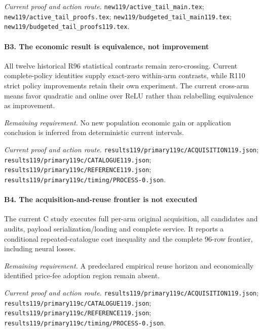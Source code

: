 \par\emph{Current proof and action route.} \nolinkurl{new119/active_tail_main.tex}; \nolinkurl{new119/active_tail_proofs.tex}; \nolinkurl{new119/budgeted_tail_main119.tex}; \nolinkurl{new119/budgeted_tail_proofs119.tex}.

\paragraph{B3. The economic result is equivalence, not improvement}

All twelve historical R96 statistical contrasts remain zero-crossing. Current complete-policy identities supply exact-zero within-arm contrasts, while R110 strict policy improvements retain their own experiment. The current cross-arm means favor quadratic and online over ReLU rather than relabelling equivalence as improvement.

\par\emph{Remaining requirement.} No new population economic gain or application conclusion is inferred from deterministic current intervals.

\par\emph{Current proof and action route.} \nolinkurl{results119/primary119c/ACQUISITION119.json}; \nolinkurl{results119/primary119c/CATALOGUE119.json}; \nolinkurl{results119/primary119c/REFERENCE119.json}; \nolinkurl{results119/primary119c/timing/PROCESS-0.json}.

\paragraph{B4. The acquisition-and-reuse frontier is not executed}

The current C study executes full per-arm original acquisition, all candidates and audits, payload serialization/\allowbreak{}loading and complete service. It reports a conditional repeated-catalogue cost inequality and the complete 96-row frontier, including neural losses.

\par\emph{Remaining requirement.} A predeclared empirical reuse horizon and economically identified price-fee adoption region remain absent.

\par\emph{Current proof and action route.} \nolinkurl{results119/primary119c/ACQUISITION119.json}; \nolinkurl{results119/primary119c/CATALOGUE119.json}; \nolinkurl{results119/primary119c/REFERENCE119.json}; \nolinkurl{results119/primary119c/timing/PROCESS-0.json}.

